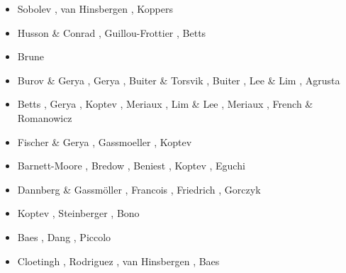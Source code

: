 \begin{scriptsize}
\begin{itemize}
\item[\twothousandeleven] Sobolev \etal \cite{sosk11}, van Hinsbergen \etal \cite{vasd11},
                          Koppers \cite{kopp11}
\item[\twothousandtwelve] Husson \& Conrad \cite{huco12}, Guillou-Frottier \etal \cite{gubc12},
                          Betts \etal \cite{bemm12}
\item[\twothousandthirteen] Brune \etal \cite{brps13}
\item[\twothousandfourteen] Burov \& Gerya \cite{buge14}, Gerya \cite{gery14b},
                            Buiter \& Torsvik \cite{buto14}, Buiter \cite{buit14},
                            Lee \& Lim \cite{leli14}, Agrusta \etal \cite{agat13}
\item[\twothousandfifteen] Betts \etal \cite{bemm15}, Gerya \etal \cite{gesb15},
                           Koptev \etal \cite{kocb15}, Meriaux \etal \cite{meds15},
                           Lim \& Lee \cite{lile15}, Meriaux \etal \cite{medd15},
                           French \& Romanowicz \cite{frro15}
\item[\twothousandsixteen] Fischer \& Gerya \cite{fige16}, Gassmoeller \etal \cite{gadb16},
                           Koptev \etal \cite{kobc16}
\item[\twothousandseventeen] Barnett-Moore \etal \cite{bahf17}, Bredow \etal \cite{brsg17},
                             Beniest \etal \cite{bekb17}, Koptev \etal \cite{kocb17},
                             Eguchi \etal \cite{egim17}
\item[\twothousandeighteen] Dannberg \& Gassm\"oller \cite{daga18}, Francois \etal \cite{frkc18},
                            Friedrich \etal \cite{frbr18}, Gorczyk \etal \cite{gomb18}
\item[\twothousandnineteen] Koptev \etal \cite{kobg19}, Steinberger \etal \cite{stbl19},
                            Bono \etal \cite{botb19}
\item[\twothousandtwenty] Baes \etal \cite{basg20,basg20b}, Dang \etal \cite{dazl20},
                          Piccolo \etal \cite{pikw20}
\item[\twothousandtwentyone] Cloetingh \etal \cite{clkk21}, Rodriguez \etal \cite{roac21},
                             van Hinsbergen \etal \cite{vasg21}, Baes \etal \cite{basg21}
\end{itemize}
\end{scriptsize}

